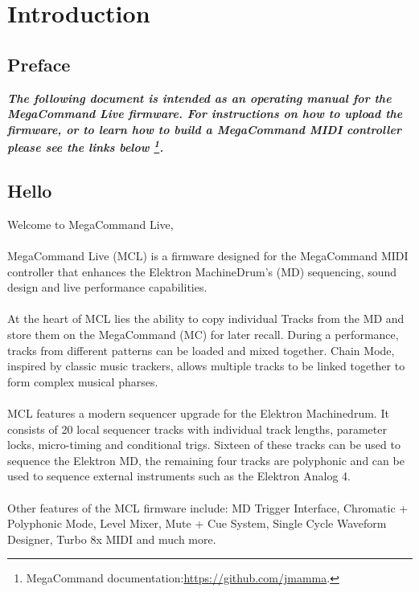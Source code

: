 \chapter{Introduction}

\section{Preface}

\begin{small}
\textbf{\textit{The following document is intended as an operating manual for the MegaCommand Live firmware. For instructions on how to upload the firmware, or to learn how to build a MegaCommand MIDI controller please see the links below \footnote{MegaCommand documentation:\url{https://github.com/jmamma}.}.}}
\end{small}

\section{Hello}
Welcome to MegaCommand Live, 
\\
\\
MegaCommand Live (MCL) is a firmware designed for the MegaCommand MIDI controller that enhances the Elektron MachineDrum's (MD) sequencing, sound design and live performance capabilities.
\\
\\
At the heart of MCL lies the ability to copy individual Tracks from the MD and store them on the MegaCommand (MC) for later recall. During a performance, tracks from different patterns can be loaded and mixed together. Chain Mode, inspired by classic music trackers, allows multiple tracks to be linked together to form complex musical pharses.
\\
\\
MCL features a modern sequencer upgrade for the Elektron Machinedrum. It consists of 20 local sequencer tracks with individual track lengths, parameter locks, micro-timing and conditional trigs. Sixteen of these tracks can be used to sequence the Elektron MD, the remaining four tracks are polyphonic and can be used to sequence external instruments such as the Elektron Analog 4. 
\\
\\
Other features of the MCL firmware include: MD Trigger Interface, Chromatic + Polyphonic Mode,  Level Mixer, Mute + Cue System, Single Cycle Waveform Designer, Turbo 8x MIDI and much more.
